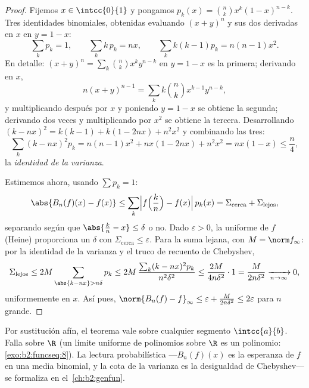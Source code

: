 \begin{proof}
Fijemos $x \in \intcc{0}{1}$ y pongamos $p_k(x) = \binom nk x^k(1 -
x)^{n-k}$. Tres identidades binomiales, obtenidas evaluando $(x +
y)^n$ y sus dos derivadas en $x$ en $y = 1 - x$:
\[
\sum_k p_k = 1,
\qquad
\sum_k k\,p_k = nx,
\qquad
\sum_k k(k-1) p_k = n(n-1)x^2 .
\]
En detalle: $(x+y)^n = \sum_k\binom nk x^ky^{n-k}$ en $y = 1-x$ es la
primera; derivando en $x$,
\[
n(x+y)^{n-1} = \sum_k k\binom nk x^{k-1}y^{n-k} ,
\]
y multiplicando después por $x$ y poniendo $y = 1 - x$ se obtiene la
segunda; derivando dos veces y multiplicando por $x^2$ se obtiene la
tercera. Desarrollando $(k - nx)^2 = k(k-1) + k(1 - 2nx) + n^2x^2$ y
combinando las tres:
\[
\sum_k (k - nx)^2 p_k
= n(n-1)x^2 + nx(1 - 2nx) + n^2x^2
= nx(1 - x) \leq \frac n4 ,
\]
la \emph{identidad de la varianza}.

Estimemos ahora, usando $\sum p_k = 1$:
\[
\abs{B_n(f)(x) - f(x)}
\leq \sum_{k} \Bigl| f\Bigl(\frac kn\Bigr) - f(x)\Bigr|\, p_k(x)
= \Sigma_{\text{cerca}} + \Sigma_{\text{lejos}} ,
\]
separando según que $\abs{\frac kn - x} \leq \delta$ o no. Dado
$\varepsilon > 0$, la  uniforme de $f$ (Heine) proporciona
un $\delta$ con $\Sigma_{\text{cerca}} \leq \varepsilon$. Para la
suma lejana, con $M = \norm f_\infty$: por la identidad de la
varianza y el truco de recuento de Chebyshev,
\[
\Sigma_{\text{lejos}} \leq 2M \sum_{\abs{k - nx} > n\delta} p_k
\leq 2M\,\frac{\sum_k (k - nx)^2 p_k}{n^2\delta^2}
\leq \frac{2M}{4 n \delta^2} \cdot 1
= \frac{M}{2n\delta^2}
\xrightarrow[n\to\infty]{} 0 ,
\]
uniformemente en $x$. Así pues, $\norm{B_n(f) - f}_\infty \leq
\varepsilon + \frac{M}{2n\delta^2} \leq 2\varepsilon$ para $n$
grande.
\end{proof}

\begin{remark}
Por sustitución afín, el teorema vale sobre cualquier segmento
$\intcc{a}{b}$. Falla sobre $\R$ (un límite uniforme de polinomios
sobre $\R$ es un polinomio: \cref{exo:b2:funcseq:8}). La lectura
probabilística ---$B_n(f)(x)$ es la esperanza de $f$ en una media
binomial, y la cota de la varianza es la desigualdad de Chebyshev---
se formaliza en el~\cref{ch:b2:genfun}.
\end{remark}

